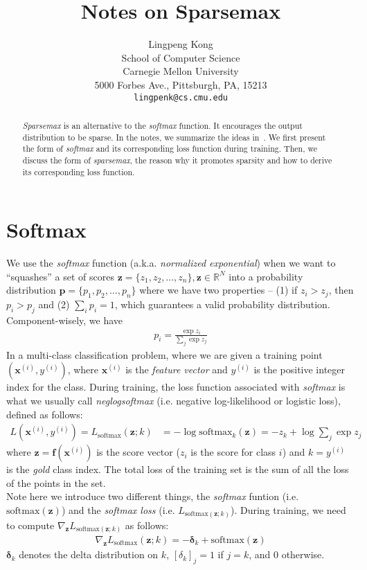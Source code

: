 \documentclass[11pt]{article}
\title{Notes on Sparsemax}
\author{Lingpeng Kong \\
  School of Computer Science \\
  Carnegie Mellon University \\
  5000 Forbes Ave., Pittsburgh, PA, 15213 \\
  {\tt lingpenk@cs.cmu.edu} \\}
\date{}
\begin{document}
\maketitle
\begin{abstract}
\textit{Sparsemax} is an alternative to the \textit{softmax} function. It encourages the output distribution to be sparse. In the notes, we summarize the ideas in~\cite{martins2016from}. We first present the form of \textit{softmax} and its corresponding loss function during training. Then, we discuss the form of \textit{sparsemax}, the reason why it promotes sparsity and how to derive its corresponding loss function.
\end{abstract}

\section{Softmax}
We use the \textit{softmax} function (a.k.a. \textit{normalized exponential}) when we want to ``squashes'' a set of scores $\boldsymbol{z} = \{z_1, z_2, \ldots, z_n\}, \boldsymbol{z} \in \mathbb{R}^N$ into a probability distribution $\boldsymbol{p} = \{p_1, p_2, \ldots, p_n\}$ where we have two properties -- (1) if $z_i > z_j$, then $p_i > p_j$ and (2) $\sum_i{p_i} = 1$, which guarantees a valid probability distribution. Component-wisely, we have
\begin{align}
p_i = \frac{\exp{z_i}}{\sum_j\exp{z_j}}\label{eq:sm}
\end{align}
In a multi-class classification problem, where we are given a training point $(\boldsymbol{x}^{(i)}, y^{(i)})$, where $\boldsymbol{x}^{(i)}$ is the \textit{feature vector} and $y^{(i)}$ is the positive integer index for the class. During training, the loss function associated with \textit{softmax} is what we usually call \textit{neglogsoftmax} (i.e. negative log-likelihood or logistic loss), defined as follows:
\begin{align}
L(\boldsymbol{x}^{(i)}, y^{(i)}) = L_{\text{softmax}}(\boldsymbol{z}; k) & = -\log \text{softmax}_{k}(\boldsymbol{z}) = -z_k + \log\sum_j\exp{z_j}\label{eq:lsm}
\end{align}
where $\boldsymbol{z} = \boldsymbol{f}(\boldsymbol{x}^{(i)})$ is the score vector ($z_i$ is the score for class $i$) and $k = y^{(i)}$ is the \textit{gold} class index. The total loss of the training set is the sum of all the loss of the points in the set.\\

Note here we introduce two different things, the \textit{softmax} funtion (i.e. $\text{softmax}(\boldsymbol{z})$) and the \textit{softmax loss} (i.e. $L_{\text{softmax}(\boldsymbol{z}; k)}$). During training, we need to compute $\nabla_{\boldsymbol{z}}L_{\text{softmax}(\boldsymbol{z}; k)}$ as follows:
\begin{align}
\nabla_{\boldsymbol{z}}L_{\text{softmax}}(\boldsymbol{z}; k) = - \boldsymbol{\delta}_k + \text{softmax}(\boldsymbol{z})\label{eq:glsm}
\end{align}
$\boldsymbol{\delta}_k$ denotes the delta distribution on $k$, $[{\delta}_k]_j = 1$ if $j = k$, and $0$ otherwise.
\end{document}
